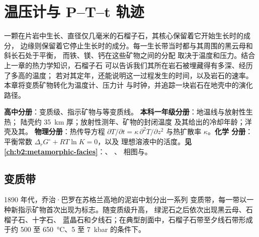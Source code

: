 \chapter{温压计与 P--T--t 轨迹}\label{ch:b2:pt-paths}

一颗在片岩中生长、直径仅几毫米的石榴子石，其核心保留着它开始生长时的成分，
边缘则保留着它停止生长时的成分。每一生长带当时都与其周围的黑云母和斜长石处于平衡，
而铁、镁、钙在这些矿物之间的分配
取决于温度和压力。结合上一章的热力学知识，石榴子石
可以告诉我们其所在岩石被埋藏得有多深、经历了多高的温度；
若对其定年，还能说明这一过程发生的时间，以及岩石的速率。
本章将变质矿物转化为温度计、压力计
与时钟，并追踪一块岩石在地壳中的演化路径。

\begin{recall}
\textbf{高中分册}：变质级、指示矿物与等变质线。
\textbf{本科一年级分册}：地温线与放射性生热；
陆壳约 \qty{35}{km} 厚；放射性测年、矿物的封闭温度
及其给出的冷却年龄；洋壳及其。
\textbf{物理分册}：热传导方程 $\partial T/\partial t = \kappa\,
\partial^2 T/\partial z^2$ 与热扩散率 $\kappa$。\textbf{化学
分册}：平衡常数 $\Delta_r G^\circ + RT\ln K = 0$，以及
理想溶液中的活度。\textbf{见\cref{ch:b2:metamorphic-facies}}：、
、 相图与。
\end{recall}

\section{变质带}\label{sec:b2:pt-paths:zones}

1890 年代，乔治·巴罗在苏格兰高地的泥岩中划分出一系列
变质带，每一带以一种新指示矿物首次出现为标志。随变质级升高，
绿泥石之后依次出现黑云母、石榴子石、十字石、
蓝晶石和夕线石；在典型剖面中，石榴子石带至夕线石带形成于约 500 至
\qty{650}{\celsius}、5 至 \qty{7}{kbar} 的条件下。

